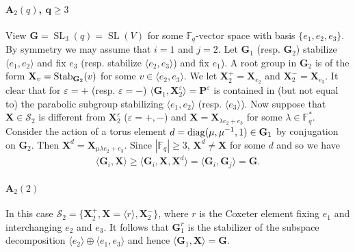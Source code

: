 \documentclass[12pt]{amsart}
\theoremstyle{definition}
\newcommand{\cS}{{\mathcal S}}
\newcommand{\diag}{\mathop{\rm diag}\nolimits}
\DeclareMathOperator{\SL}{SL}
\newcommand{\FF}{{\mathbb F}}
\newcommand{\Stab}{\mathop{\rm Stab}}
\newcommand{\vep}{\varepsilon}
\newcommand{\amgrpG}{{\mathbf{G}}}
\newcommand{\amgrpP}{{\mathbf{P}}}
\newcommand{\amgrpX}{{\mathbf{X}}}
\begin{document}
\paragraph{\bf ${\mathbf A_2(q)}$, ${\mathbf q\ge 3}$}
View $\amgrpG=\SL_3(q)=\SL(V)$ for some $\FF_q$-vector space with basis $\{e_1,e_2,e_3\}$.
By symmetry we may assume that $i=1$ and $j=2$.
Let $\amgrpG_1$ (resp. $\amgrpG_2$) stabilize $\langle e_1,e_2\rangle$  and fix $ e_3$ (resp. stabilize $\langle e_2,e_3\rangle$) and fix $e_1$).
A root group in $\amgrpG_2$ is of the form $\amgrpX_v=\Stab_{\amgrpG_2}(v)$ for some $v\in\langle e_2,e_3\rangle$.
We let $\amgrpX_2^+=\amgrpX_{e_2}$ and $\amgrpX_2^-=\amgrpX_{e_3}$.
It clear that for $\vep=+$ (resp. $\vep=-$) $\langle \amgrpG_1,\amgrpX_2^\vep\rangle=\amgrpP^\vep$  is contained in (but not equal to) the parabolic subgroup stabilizing $\langle e_1,e_2\rangle$  (resp. $\langle e_3\rangle$).
Now suppose that $\amgrpX\in \cS_2$ is different from $\amgrpX_2^\vep$ ($\vep=+,-$) and $\amgrpX=\amgrpX_{\lambda e_2+ e_3}$ for some $\lambda\in \FF_q^*$.
Consider the action of a torus element $d=\diag(\mu, \mu^{-1}, 1)\in \amgrpG_1$
by conjugation on $\amgrpG_2$. Then $\amgrpX^d=\amgrpX_{\mu\lambda e_2+e_3}$.
 Since $|\FF_q|\ge 3$, $\amgrpX^d\ne \amgrpX$ for some $d$ and so we have 
 \begin{align}
\langle \amgrpG_i,\amgrpX\rangle\ge \langle \amgrpG_i,\amgrpX,\amgrpX^d\rangle =
\langle\amgrpG_i,\amgrpG_j\rangle = \amgrpG.\label{eqn:G1XXd}
 \end{align}
\paragraph{\bf ${\mathbf A_2(2)}$}
In this case $\cS_2 =\{\amgrpX_2^+,\amgrpX=\langle r\rangle, \amgrpX_2^-\}$, where 
 $r$ is the Coxeter element fixing $e_1$ and interchanging $e_2$ and $e_3$.
It follows that  $\amgrpG_1^r$ is the stabilizer of the subspace decomposition $\langle e_2\rangle\oplus\langle e_1,e_3\rangle$ and hence $\langle \amgrpG_1,\amgrpX\rangle=\amgrpG$.
\end{document}
